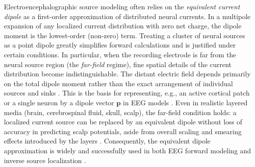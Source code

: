 \documentclass[final, a4paper,masters,en,listoffigures,listoftables,norwegiandates]{NMBU}
\begin{document}
Electroencephalographic source modeling often relies on the \textit{equivalent current dipole} as a first-order approximation of distributed neural currents. In a multipole expansion of any localized current distribution with zero net charge, the dipole moment is the lowest-order (non-zero) term. Treating a cluster of neural sources as a point dipole greatly simplifies forward calculations and is justified under certain conditions. In particular, when the recording electrode is far from the neural source region (the \textit{far-field} regime), fine spatial details of the current distribution become indistinguishable. The distant electric field depends primarily on the total dipole moment rather than the exact arrangement of individual sources and sinks \cite{Halnes2024ElectricBrainSignals}. This is the basis for representing, e.g., an active cortical patch or a single neuron by a dipole vector $\mathbf{p}$ in EEG models \cite{Næss2015}. Even in realistic layered media (brain, cerebrospinal fluid, skull, scalp), the far-field condition holds: a localized current source can be replaced by an equivalent dipole without loss of accuracy in predicting scalp potentials, aside from overall scaling and smearing effects introduced by the layers \cite{Nunez2006}. Consequently, the equivalent dipole approximation is widely and successfully used in both EEG forward modeling and inverse source localization \cite{Nunez2006, Buzsaki2012}.
\end{document}

